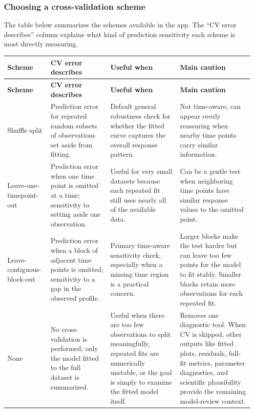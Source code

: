 \subsubsection{Choosing a cross-validation scheme}

The table below summarizes the schemes available in the app. The ``CV error describes'' column explains what kind of prediction sensitivity each scheme is most directly measuring.

\begin{longtable}{@{}>{\raggedright\arraybackslash}p{}>{\raggedright\arraybackslash}p{}>{\raggedright\arraybackslash}p{}>{\raggedright\arraybackslash}p{}@{}}
\toprule
\textbf{Scheme} & \textbf{CV error describes} & \textbf{Useful when} & \textbf{Main caution} \\
\midrule
\endfirsthead
\toprule
\textbf{Scheme} & \textbf{CV error describes} & \textbf{Useful when} & \textbf{Main caution} \\
\midrule
\endhead
Shuffle split & Prediction error for repeated random subsets of observations set aside from fitting. & Default general robustness check for whether the fitted curve captures the overall response pattern. & Not time-aware; can appear overly reassuring when nearby time points carry similar information. \\
Leave-one-timepoint-out & Prediction error when one time point is omitted at a time; sensitivity to setting aside one observation. & Useful for very small datasets because each repeated fit still uses nearly all of the available data. & Can be a gentle test when neighboring time points have similar response values to the omitted point. \\
Leave-contiguous-block-out & Prediction error when a block of adjacent time points is omitted; sensitivity to a gap in the observed profile. & Primary time-aware sensitivity check, especially when a missing time region is a practical concern. & Larger blocks make the test harder but can leave too few points for the model to fit stably. Smaller blocks retain more observations for each repeated fit. \\
None & No cross-validation is performed; only the model fitted to the full dataset is summarized. & Useful when there are too few observations to split meaningfully, repeated fits are numerically unstable, or the goal is simply to examine the fitted model itself. & Removes one diagnostic tool. When CV is skipped, other outputs like fitted plots, residuals, full-fit metrics, parameter diagnostics, and scientific plausibility provide the remaining model-review context. \\
\bottomrule
\end{longtable}

